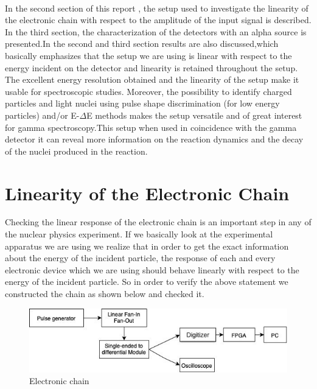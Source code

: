 \documentclass[a4paper, 11pt]{article}
\begin{document}
\paragraph{}
In the  second section of this report , the setup used to investigate the linearity of the electronic chain with respect to the amplitude of the input signal is described. In the third section, the characterization of the detectors with an alpha source is presented.In the second and third section results are also discussed,which basically emphasizes that the setup we are using is linear with respect to the energy incident on the detector and linearity is retained throughout the setup. The excellent energy resolution obtained and the linearity of the setup make it usable for spectroscopic studies. Moreover, the possibility to identify charged particles and light nuclei using pulse shape discrimination (for low energy particles) and/or E-$\Delta$E methods makes the setup versatile and of great interest for gamma spectroscopy.This setup when used in coincidence with the gamma detector it can reveal more information on the reaction dynamics and the decay of the nuclei produced in the reaction.


\section{Linearity of the Electronic Chain}
Checking the linear response of the electronic chain is an important step in any of the nuclear physics experiment. If we basically look at the experimental apparatus we are using we realize that in order to get the exact information about the energy of the incident particle, the response of each and every electronic device which we are using should behave linearly with respect to the energy of the incident particle. So in order to verify the above statement we constructed the chain as shown below and checked it.

\begin{figure}[h]
    \centering
    \includegraphics[scale = 0.5]{img/electronic_chain_diagram}
    \caption{Electronic chain}
    \label{fig:my_label}
\end{figure}
\end{document}
